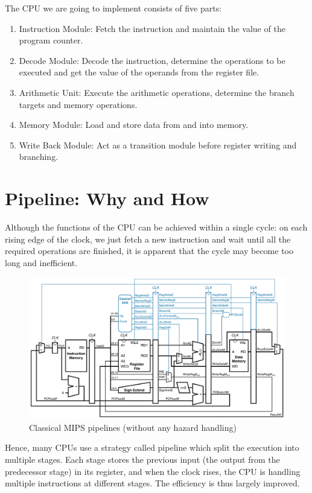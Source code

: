 \documentclass[a4paper,12pt, oneside]{book}
\begin{document}
The CPU we are going to implement consists of five parts:
\begin{enumerate}
	\item Instruction Module: Fetch the instruction and maintain the value of the program counter.
	\item Decode Module: Decode the instruction, determine the operations to be executed and get the value of the operands from the register file.
	\item Arithmetic Unit: Execute the arithmetic operations, determine the branch targets and memory operations.
	\item Memory Module: Load and store data from and into memory.
	\item Write Back Module: Act as a transition module before register writing and branching. 
\end{enumerate}
\section{Pipeline: Why and How}
Although the functions of the CPU can be achieved within a single cycle: on each rising edge of the clock, we just fetch a new instruction and wait until all the required operations are finished, it is apparent that the cycle may become too long and inefficient. 
\begin{figure}[H]
	\centering
	\includegraphics[width=\linewidth]{pipeline}
	\caption{Classical MIPS pipelines (without any hazard handling)}
\end{figure}
Hence, many CPUs use a strategy called pipeline which split the execution into multiple stages. Each stage stores the previous input (the output from the predecessor stage) in its register, and when the clock rises, the CPU is handling multiple instructions at different stages. The efficiency is thus largely improved.
\end{document}
